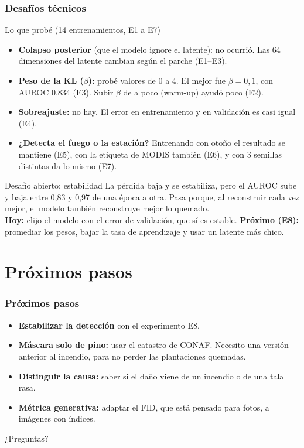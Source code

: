 \documentclass[10pt,aspectratio=169]{beamer}
\begin{document}
\begin{frame}
  \frametitle{Desafíos técnicos}
  \small
  \begin{block}{Lo que probé (14 entrenamientos, E1 a E7)}
    \begin{itemize}\itemsep0.15em
      \item \textbf{Colapso posterior} (que el modelo ignore el latente): no ocurrió. Las 64 dimensiones del latente cambian según el parche (E1--E3).
      \item \textbf{Peso de la KL ($\beta$):} probé valores de 0 a 4. El mejor fue $\beta = 0{,}1$, con AUROC 0,834 (E3). Subir $\beta$ de a poco (warm-up) ayudó poco (E2).
      \item \textbf{Sobreajuste:} no hay. El error en entrenamiento y en validación es casi igual (E4).
      \item \textbf{¿Detecta el fuego o la estación?} Entrenando con otoño el resultado se mantiene (E5), con la etiqueta de MODIS también (E6), y con 3 semillas distintas da lo mismo (E7).
    \end{itemize}
  \end{block}
  \begin{alertblock}{Desafío abierto: estabilidad}
    La pérdida baja y se estabiliza, pero el AUROC sube y baja entre 0,83 y 0,97 de una época a otra. Pasa porque, al reconstruir cada vez mejor, el modelo también reconstruye mejor lo quemado.\\[0.3em]
    \textbf{Hoy:} elijo el modelo con el error de validación, que sí es estable.
    \textbf{Próximo (E8):} promediar los pesos, bajar la tasa de aprendizaje y usar un latente más chico.
  \end{alertblock}
\end{frame}

\section[Cierre]{Próximos pasos}

\begin{frame}
  \frametitle{Próximos pasos}
  \begin{itemize}\itemsep0.5em
    \item \textbf{Estabilizar la detección} con el experimento E8.
    \item \textbf{Máscara solo de pino:} usar el catastro de CONAF. Necesito una versión anterior al incendio, para no perder las plantaciones quemadas.
    \item \textbf{Distinguir la causa:} saber si el daño viene de un incendio o de una tala rasa.
    \item \textbf{Métrica generativa:} adaptar el FID, que está pensado para fotos, a imágenes con índices.
  \end{itemize}
  \vspace{1.5em}
  \centering
  \Large ¿Preguntas?
\end{frame}
\end{document}
